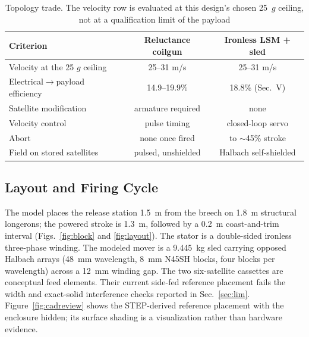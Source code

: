 \documentclass[conference]{IEEEtran}
\begin{document}
\begin{table}[t]
\caption{Topology trade. The velocity row is evaluated at this design's chosen 25~$g$ ceiling, not at a qualification limit of the payload}
\label{tab:trade}
\centering\scriptsize\setlength{\tabcolsep}{4pt}
\begin{tabular}{lcc}
\toprule
Criterion & Reluctance coilgun & Ironless LSM + sled\\
\midrule
Velocity at the 25 $g$ ceiling & 25--31 m/s & 25--31 m/s\\
Electrical$\rightarrow$payload efficiency & 14.9--19.9\% \cite{feng2025} & 18.8\% (Sec.~V)\\
Satellite modification & armature required & none\\
Velocity control & pulse timing & closed-loop servo\\
Abort & none once fired & to $\sim$45\% stroke\\
Field on stored satellites & pulsed, unshielded & Halbach self-shielded\\
\bottomrule
\end{tabular}
\end{table}

\subsection{Layout and Firing Cycle}
The model places the release station 1.5~m from the breech on 1.8~m structural longerons; the powered stroke is 1.3~m, followed by a 0.2~m coast-and-trim interval (Figs.~\ref{fig:block} and \ref{fig:layout}). The stator is a double-sided ironless three-phase winding. The modeled mover is a 9.445~kg sled carrying opposed Halbach arrays (48~mm wavelength, 8~mm N45SH blocks, four blocks per wavelength) across a 12~mm winding gap. The two six-satellite cassettes are conceptual feed elements. Their current side-fed reference placement fails the width and exact-solid interference checks reported in Sec.~\ref{sec:lim}. Figure~\ref{fig:cadreview} shows the STEP-derived reference placement with the enclosure hidden; its surface shading is a visualization rather than hardware evidence.
\end{document}
